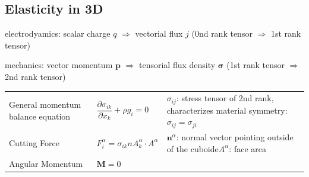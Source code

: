 \subsection{Elasticity in 3D}
	electrodyamics: scalar charge $q$ $\Rightarrow$ vectorial flux $j$ (0nd rank tensor $\Rightarrow$ 1st rank tensor)
	
	mechanics: vector momentum $\mathbf{p}$ $\Rightarrow$ tensorial flux density $\mathbf{\sigma}$ (1st rank tensor $\Rightarrow$ 2nd rank tensor)

\begin{tabularx}{ \columnwidth} {lXX}
	General momentum balance equation &  $\dfrac{\partial \sigma_{ik}}{\partial x_k} + \rho g_i = 0$ & $\sigma_{ij}$: stress tensor of 2nd rank, characterizes material symmetry: $\sigma_{ij} = \sigma_{ji}$\\
	Cutting Force & $F_i^\alpha = \sigma_{ik} nA^\alpha_k \cdot A^\alpha$ & $\mathbf{n}^\alpha$: normal vector pointing outside of the cuboide\newline $A^\alpha$: face area \\
	Angular Momentum & $\mathbf{M} = 0 $ & \\
	
\end{tabularx}
	\renewcommand{\arraystretch}{2}
